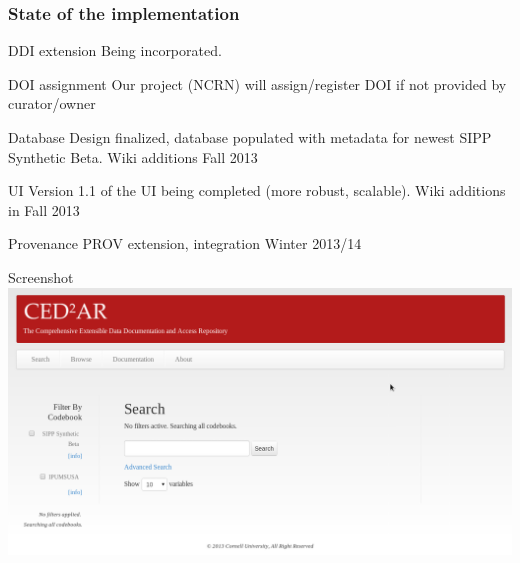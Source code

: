\begin{frame}
\frametitle{State of the implementation}
\begin{block}{DDI extension}
Being incorporated.
\end{block}
\begin{block}{DOI assignment}
Our project (NCRN) will assign/register DOI if not provided by curator/owner
\end{block}
\begin{block}{Database}
Design finalized, database populated with  metadata for newest SIPP Synthetic Beta. Wiki additions  Fall 2013
\end{block}
\begin{block}{UI}
Version 1.1 of the UI being completed (more robust, scalable). Wiki additions in Fall 2013
\end{block}
\begin{block}{Provenance}
PROV extension, integration Winter 2013/14
\end{block}

\end{frame}

\begin{frame}{Screenshot}
\includegraphics[width=\textwidth]{ced2ar-20130803.png}
\end{frame}


